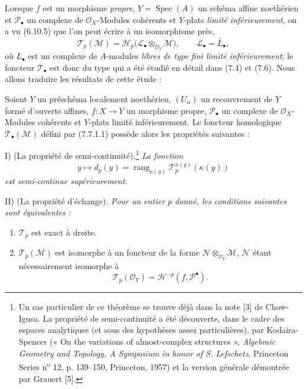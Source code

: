 \begin{env}[7.7.4]
Lorsque $f$ est un morphisme \emph{propre}, $Y=\operatorname{Spec}(A)$ un schéma
affine noethérien et $\mathscr P_\bullet$ un complexe de
$\mathscr O_X$-Modules cohérents et $Y$-plats \emph{limité inférieurement}, on a
vu (6.10.5) que l'on peut écrire à un isomorphisme près,
\[
  \mathscr T_p(\mathscr M)
  =\mathscr H_p
    \bigl(\mathscr L_\bullet\otimes_{\mathscr O_Y}\mathscr M\bigr),
  \qquad
  \mathscr L_\bullet=\widetilde{L_\bullet},
\]
où $L_\bullet$ est un complexe de $A$-modules \emph{libres de type fini limité
inférieurement}; le foncteur $\mathscr T_\bullet$ est donc du type qui a été
étudié en détail dans (7.4) et (7.6). Nous allons traduire les résultats de cette
étude :
\end{env}

\begin{theorem}[7.7.5]
Soient $Y$ un préschéma localement noethérien, $(U_\alpha)$ un recouvrement de
$Y$ formé d'ouverts affines, $f:X\to Y$ un morphisme propre,
$\mathscr P_\bullet$ un complexe de $\mathscr O_X$-Modules cohérents et $Y$-plats
limité inférieurement. Le foncteur homologique $\mathscr T_\bullet(\mathscr M)$
défini par (7.7.1.1) possède alors les propriétés suivantes :

\medskip
\noindent
\textnormal{I) (La propriété de semi-continuité).}\footnote{Un cas particulier de
ce théorème se trouve déjà dans la note [3] de Chow-Igusa. La propriété de
semi-continuité a été découverte, dans le cadre des espaces analytiques (et sous
des hypothèses assez particulières), par Kodaira-Spencer (« On the variations of
almost-complex structures », \emph{Algebraic Geometry and Topology, A Symposium in
honor of S. Lefschetz}, Princeton Series n\textsuperscript{o} 12, p. 139--150,
Princeton, 1957) et la version générale démontrée par Grauert [5].}
\emph{La fonction}
\[
  y\longmapsto
  d_p(y)
  =
  \operatorname{rang}_{\kappa(y)}
    \mathscr T_p^{\kappa(y)}(\kappa(y))
  \tag{7.7.5.1}\label{III.7.7.5.1.fr}
\]
\emph{est semi-continue supérieurement.}

\medskip
\noindent
\textnormal{II) (La propriété d'échange).}
\emph{Pour un entier $p$ donné, les conditions suivantes sont équivalentes :}
\begin{enumerate}
  \item[a)] $\mathscr T_p$ est exact à droite.

  \item[a$'$)] $\mathscr T_p(\mathscr M)$ est isomorphe à un foncteur de la forme
    $\mathscr N\otimes_{\mathscr O_Y}\mathscr M$, $\mathscr N$ étant nécessairement
    isomorphe à
    \[
      \mathscr T_p(\mathscr O_Y)
      =
      \mathscr H^{-p}(f,\mathscr P^\bullet).
    \]


\end{enumerate}
\end{theorem}
